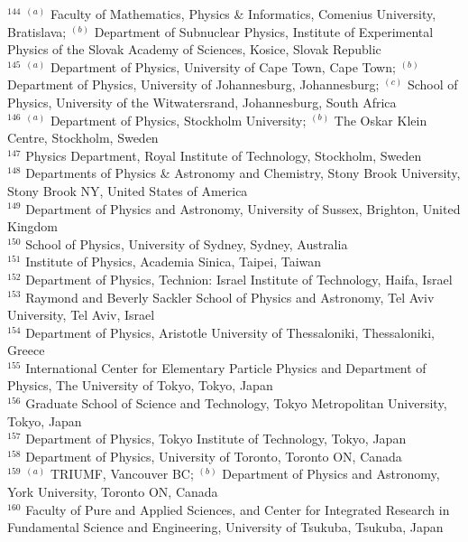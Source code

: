 \begin{flushleft}
$^{144}$ $^{(a)}$ Faculty of Mathematics, Physics {\&} Informatics, Comenius University, Bratislava; $^{(b)}$ Department of Subnuclear Physics, Institute of Experimental Physics of the Slovak Academy of Sciences, Kosice, Slovak Republic\\
$^{145}$ $^{(a)}$ Department of Physics, University of Cape Town, Cape Town; $^{(b)}$ Department of Physics, University of Johannesburg, Johannesburg; $^{(c)}$ School of Physics, University of the Witwatersrand, Johannesburg, South Africa\\
$^{146}$ $^{(a)}$ Department of Physics, Stockholm University; $^{(b)}$ The Oskar Klein Centre, Stockholm, Sweden\\
$^{147}$ Physics Department, Royal Institute of Technology, Stockholm, Sweden\\
$^{148}$ Departments of Physics {\&} Astronomy and Chemistry, Stony Brook University, Stony Brook NY, United States of America\\
$^{149}$ Department of Physics and Astronomy, University of Sussex, Brighton, United Kingdom\\
$^{150}$ School of Physics, University of Sydney, Sydney, Australia\\
$^{151}$ Institute of Physics, Academia Sinica, Taipei, Taiwan\\
$^{152}$ Department of Physics, Technion: Israel Institute of Technology, Haifa, Israel\\
$^{153}$ Raymond and Beverly Sackler School of Physics and Astronomy, Tel Aviv University, Tel Aviv, Israel\\
$^{154}$ Department of Physics, Aristotle University of Thessaloniki, Thessaloniki, Greece\\
$^{155}$ International Center for Elementary Particle Physics and Department of Physics, The University of Tokyo, Tokyo, Japan\\
$^{156}$ Graduate School of Science and Technology, Tokyo Metropolitan University, Tokyo, Japan\\
$^{157}$ Department of Physics, Tokyo Institute of Technology, Tokyo, Japan\\
$^{158}$ Department of Physics, University of Toronto, Toronto ON, Canada\\
$^{159}$ $^{(a)}$ TRIUMF, Vancouver BC; $^{(b)}$ Department of Physics and Astronomy, York University, Toronto ON, Canada\\
$^{160}$ Faculty of Pure and Applied Sciences, and Center for Integrated Research in Fundamental Science and Engineering, University of Tsukuba, Tsukuba, Japan\\

\end{flushleft}
